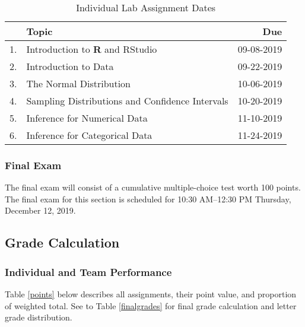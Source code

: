 \documentclass[article]{article}
\begin{document}
\begin{table}[H]
\begin{center}
\caption{Individual Lab Assignment Dates}
\label{labs}
\vspace{3mm}
\begin{tabular}{llr}
\hline
 & {\bf{Topic}} & {\bf{Due}}\\
\hline
1. & Introduction to \textbf{\textsf{R}} and RStudio & 09-08-2019\\
2. & Introduction to Data & 09-22-2019\\
3. & The Normal Distribution & 10-06-2019\\
4. & Sampling Distributions and Confidence Intervals & 10-20-2019\\
5. & Inference for Numerical Data & 11-10-2019\\
6. & Inference for Categorical Data & 11-24-2019\\
\hline
\end{tabular}
\end{center}
\end{table}%

\subsubsection{Final Exam}
The final exam will consist of a cumulative multiple-choice test worth 100 points. The final exam for this section is scheduled for 10:30 AM--12:30 PM Thursday, December 12, 2019.

\subsection{Grade Calculation}

\subsubsection{Individual and Team Performance}
Table \ref{points} below describes all assignments, their point value, and proportion of weighted total. See to Table \ref{finalgrades} for final grade calculation and letter grade distribution.
\end{document}
